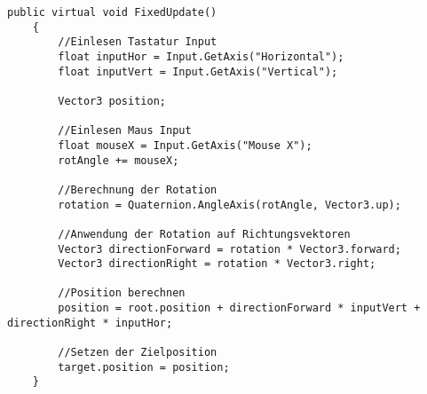 \begin{lstlisting}[caption={ Nutzersteuerung für First- und Thirdperson},captionpos=b,label={lst:nutzersteuerung_3}]
public virtual void FixedUpdate()
    {
        //Einlesen Tastatur Input
        float inputHor = Input.GetAxis("Horizontal");
        float inputVert = Input.GetAxis("Vertical");

        Vector3 position;

        //Einlesen Maus Input
        float mouseX = Input.GetAxis("Mouse X");
        rotAngle += mouseX;

        //Berechnung der Rotation
        rotation = Quaternion.AngleAxis(rotAngle, Vector3.up);

        //Anwendung der Rotation auf Richtungsvektoren
        Vector3 directionForward = rotation * Vector3.forward;
        Vector3 directionRight = rotation * Vector3.right;

        //Position berechnen
        position = root.position + directionForward * inputVert + directionRight * inputHor;

        //Setzen der Zielposition
        target.position = position;
    }
\end{lstlisting}

